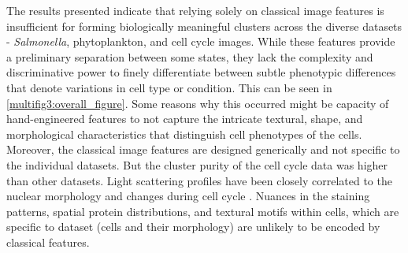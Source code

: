 \documentclass[12pt,a4paper]{article}
\begin{document}
The results presented indicate that relying solely on classical image features is insufficient for forming biologically meaningful clusters across the diverse datasets - \textit{Salmonella}, phytoplankton, and cell cycle images. While these features provide a preliminary separation between some states, they lack the complexity and discriminative power to finely differentiate between subtle phenotypic differences that denote variations in cell type or condition. This can be seen in \ref{multifig3:overall_figure}. Some reasons why this occurred might be capacity of hand-engineered features to not capture the intricate textural, shape, and morphological characteristics that distinguish cell phenotypes of the cells. Moreover, the classical image features are designed generically and not specific to the individual datasets. But the cluster purity of the cell cycle data was higher than other datasets. Light scattering profiles have been closely correlated to the nuclear morphology and changes during cell cycle \cite{WOS:A1974T155500001, benson_mcdougal_coffey_1984}. Nuances in the staining patterns, spatial protein distributions, and textural motifs within cells, which are specific to dataset (cells and their morphology) are unlikely to be encoded by classical features.
\end{document}
